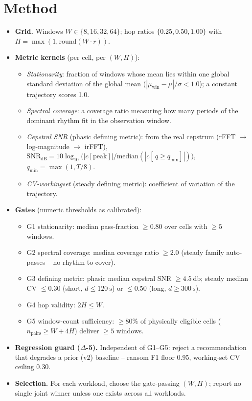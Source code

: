 \documentclass[conference]{IEEEtran}
\begin{document}
\section{Method}
\begin{itemize}
  \item \textbf{Grid.} Windows $W \in \{8,16,32,64\}$; hop ratios
        $\{0.25, 0.50, 1.00\}$ with $H = \max(1, \mathrm{round}(W \cdot r))$.
  \item \textbf{Metric kernels} (per cell, per $(W,H)$):
    \begin{itemize}
      \item \emph{Stationarity}: fraction of windows whose mean lies within one
            global standard deviation of the global mean
            ($|\mu_{\text{win}}-\mu|/\sigma < 1.0$); a constant trajectory scores
            1.0.
      \item \emph{Spectral coverage}: a coverage ratio measuring how many
            periods of the dominant rhythm fit in the observation window.
      \item \emph{Cepstral SNR} (phasic defining metric): from the real cepstrum
            (rFFT $\to$ log-magnitude $\to$ irFFT),
            $\mathrm{SNR}_{\text{dB}} = 10\log_{10}\!\big(|c[\text{peak}]| /
            \mathrm{median}(|c[\,q\!\ge\!q_{\min}]|)\big)$,
            $q_{\min}=\max(1, T/8)$.
      \item \emph{CV-workingset} (steady defining metric): coefficient of
            variation of the trajectory.
    \end{itemize}
  \item \textbf{Gates} (numeric thresholds as calibrated):
    \begin{itemize}
      \item G1 stationarity: median pass-fraction $\ge 0.80$ over cells with
            $\ge 5$ windows.
      \item G2 spectral coverage: median coverage ratio $\ge 2.0$ (steady family
            auto-passes -- no rhythm to cover).
      \item G3 defining metric: phasic median cepstral SNR $\ge \SI{4.5}{\decibel}$;
            steady median CV $\le 0.30$ (short, $d\le\SI{120}{\second}$) or
            $\le 0.50$ (long, $d\ge\SI{300}{\second}$).
      \item G4 hop validity: $2H \le W$.
      \item G5 window-count sufficiency: $\ge 80\%$ of physically eligible cells
            ($n_{\text{pairs}} \ge W+4H$) deliver $\ge 5$ windows.
    \end{itemize}
  \item \textbf{Regression guard ($\Delta$-5).} Independent of G1--G5: reject a
        recommendation that degrades a prior (v2) baseline -- ransom F1 floor
        0.95, working-set CV ceiling 0.30.
  \item \textbf{Selection.} For each workload, choose the gate-passing $(W,H)$;
        report no single joint winner unless one exists across all workloads.
\end{itemize}
\end{document}
